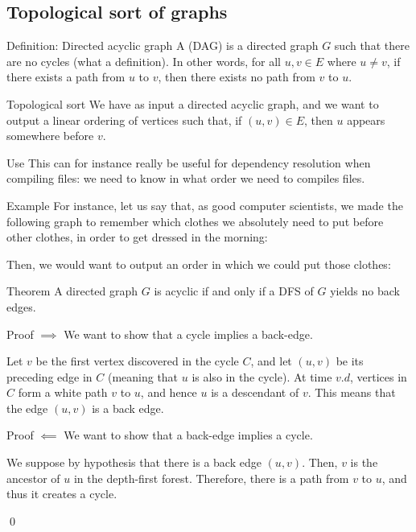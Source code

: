 \documentclass[a4paper]{article}
\begin{document}
\subsection{Topological sort of graphs}
\begin{parag}{Definition: Directed acyclic graph}
    A  (DAG) is a directed graph $G$ such that there are no cycles (what a definition). In other words, for all $u, v \in E$ where $u \neq v$, if there exists a path from $u$ to $v$, then there exists no path from $v$ to $u$.
\end{parag}

\begin{parag}{Topological sort}
    We have as input a directed acyclic graph, and we want to output a linear ordering of vertices such that, if $\left(u, v\right) \in E$, then $u$ appears somewhere before $v$.

    \begin{subparag}{Use}
        This can for instance really be useful for dependency resolution when compiling files: we need to know in what order we need to compiles files.
    \end{subparag}
    
    \begin{subparag}{Example}
        For instance, let us say that, as good computer scientists, we made the following graph to remember which clothes we absolutely need to put before other clothes, in order to get dressed in the morning:

        Then, we would want to output an order in which we could put those clothes: 
    \end{subparag}
\end{parag}

\begin{parag}{Theorem}
    A directed graph $G$ is acyclic if and only if a DFS of $G$ yields no back edges.

    \begin{subparag}{Proof $\implies$}
        We want to show that a cycle implies a back-edge.

        Let $v$ be the first vertex discovered in the cycle $C$, and let $\left(u, v\right)$ be its preceding edge in $C$ (meaning that $u$ is also in the cycle). At time $v.d$, vertices in $C$ form a white path $v$ to $u$, and hence $u$ is a descendant of $v$. This means that the edge $\left(u, v\right)$ is a back edge.
    \end{subparag}

    \begin{subparag}{Proof $\impliedby$}
        We want to show that a back-edge implies a cycle.

        We suppose by hypothesis that there is a back edge $\left(u, v\right)$. Then, $v$ is the ancestor of $u$ in the depth-first forest. Therefore, there is a path from $v$ to $u$, and thus it creates a cycle.

        \qed
    \end{subparag}
\end{parag}
\end{document}
